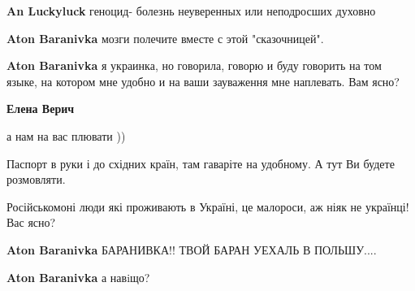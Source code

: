 \begin{itemize}
\begin{itemize}
\begin{itemize}
\textbf{An Luckyluck} геноцид- болезнь неуверенных или неподросших духовно
\end{itemize}

 
\textbf{Aton Baranivka} мозги полечите вместе с этой "сказочницей".

 
\textbf{Aton Baranivka} я украинка, но говорила, говорю и буду говорить на том языке, на котором мне удобно и на ваши зауваження мне наплевать. Вам ясно?

\begin{itemize}
 
\textbf{Елена Верич} 

а нам на вас плювати ))

Паспорт в руки і до східних країн, там гаваріте на удобному. А тут Ви будете розмовляти.

Російськомоні люди які проживають в Україні, це малороси, аж ніяк не українці! Вас ясно?
\end{itemize}

 
\textbf{Aton Baranivka} БАРАНИВКА!! ТВОЙ БАРАН УЕХАЛЬ В ПОЛЬШУ....

 
\textbf{Aton Baranivka} а навiщо?


\end{itemize}
\end{itemize}
